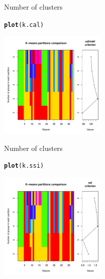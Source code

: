 \documentclass[10pt,xcolor=dvipsnames]{beamer}\usepackage[]{graphicx}\usepackage[]{color}
\makeatletter
\newcommand{\hlstd}[1]{\textcolor[rgb]{0.345,0.345,0.345}{#1}}%
\newcommand{\hlkwd}[1]{\textcolor[rgb]{0.737,0.353,0.396}{\textbf{#1}}}%
\newenvironment{kframe}{%
 \def\at@end@of@kframe{}%
 \ifinner\ifhmode%
  \def\at@end@of@kframe{\end{minipage}}%
  \begin{minipage}{\columnwidth}%
 \fi\fi%
 \def\FrameCommand##1{\hskip\@totalleftmargin \hskip-\fboxsep
 \colorbox{shadecolor}{##1}\hskip-\fboxsep
     \hskip-\linewidth \hskip-\@totalleftmargin \hskip\columnwidth}%
 \MakeFramed {\advance\hsize-\width
   \@totalleftmargin\z@ \linewidth\hsize
   \@setminipage}}%
 {\par\unskip\endMakeFramed%
 \at@end@of@kframe}
\newenvironment{knitrout}{}{} %
\makeatother
\begin{document}
\begin{frame}{Number of clusters}

\begin{knitrout}\footnotesize
{}\color{fgcolor}\begin{kframe}
\begin{alltt}
\hlkwd{plot}\hlstd{(k.cal)}
\end{alltt}
\end{kframe}

{\centering \includegraphics[width=2in]{figure/plotCal-1} 

}



\end{knitrout}

\end{frame}


\begin{frame}{Number of clusters}

\begin{knitrout}\footnotesize
{}\color{fgcolor}\begin{kframe}
\begin{alltt}
\hlkwd{plot}\hlstd{(k.ssi)}
\end{alltt}
\end{kframe}

{\centering \includegraphics[width=2in]{figure/plotSsi-1} 

}



\end{knitrout}

\end{frame}
\end{document}
